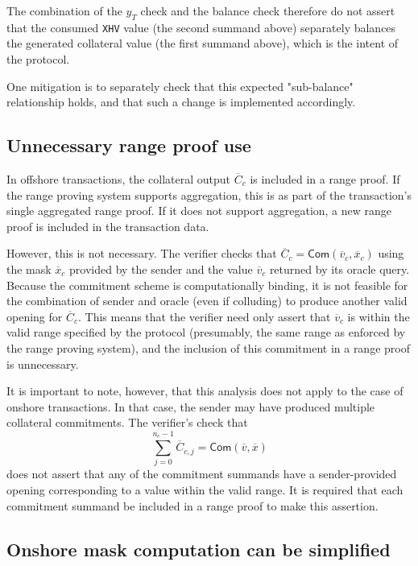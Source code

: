 \documentclass{article}
\newcommand{\com}{\mathsf{Com}}
\begin{document}
The combination of the $y_T$ check and the balance check therefore do not assert that the consumed \texttt{XHV} value (the second summand above) separately balances the generated collateral value (the first summand above), which is the intent of the protocol.

One mitigation is to separately check that this expected "sub-balance" relationship holds, and that such a change is implemented accordingly.


\subsection{Unnecessary range proof use}

In offshore transactions, the collateral output $\overline{C}_c$ is included in a range proof.
If the range proving system supports aggregation, this is as part of the transaction's single aggregated range proof.
If it does not support aggregation, a new range proof is included in the transaction data.

However, this is not necessary.
The verifier checks that $\overline{C}_c = \com(\overline{v}_c, \overline{x}_c)$ using the mask $\overline{x}_c$ provided by the sender and the value $\overline{v}_c$ returned by its oracle query.
Because the commitment scheme is computationally binding, it is not feasible for the combination of sender and oracle (even if colluding) to produce another valid opening for $\overline{C}_c$.
This means that the verifier need only assert that $\overline{v}_c$ is within the valid range specified by the protocol (presumably, the same range as enforced by the range proving system), and the inclusion of this commitment in a range proof is unnecessary.

It is important to note, however, that this analysis does not apply to the case of onshore transactions.
In that case, the sender may have produced multiple collateral commitments.
The verifier's check that
$$\sum_{j=0}^{n_c-1} \overline{C}_{c,j} = \com(\overline{v}, \overline{x})$$
does not assert that any of the commitment summands have a sender-provided opening corresponding to a value within the valid range.
It is required that each commitment summand be included in a range proof to make this assertion.


\subsection{Onshore mask computation can be simplified}
\end{document}
